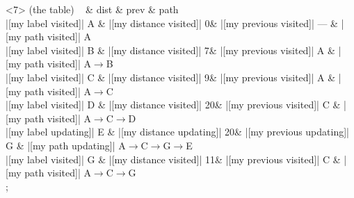 \begin{onlyenv}<7>
 (the table) {
~ \& dist \& prev \& path \\
|[my label visited]| A \& |[my distance visited]| 0\& |[my previous visited]| --- \& |[my path visited]| A\\
|[my label visited]| B \& |[my distance visited]| 7\& |[my previous visited]| A \& |[my path visited]| A$\rightarrow$B\\
|[my label visited]| C \& |[my distance visited]| 9\& |[my previous visited]| A \& |[my path visited]| A$\rightarrow$C\\
|[my label visited]| D \& |[my distance visited]| 20\& |[my previous visited]| C \& |[my path visited]| A$\rightarrow$C$\rightarrow$D\\
|[my label updating]| E \& |[my distance updating]| 20\& |[my previous updating]| G \& |[my path updating]| A$\rightarrow$C$\rightarrow$G$\rightarrow$E\\
|[my label visited]| G \& |[my distance visited]| 11\& |[my previous visited]| C \& |[my path visited]| A$\rightarrow$C$\rightarrow$G\\
};
\end{onlyenv}
            
